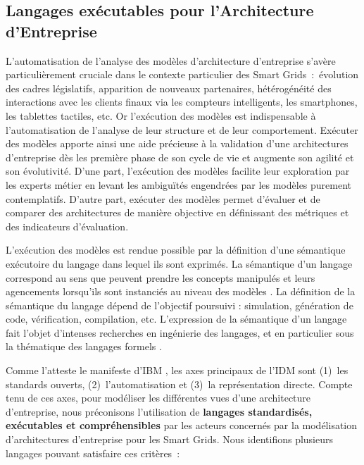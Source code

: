 %
%
%
%
%
%
%



\subsection{Langages exécutables pour l'Architecture d'Entreprise}

L'automatisation de l'analyse des modèles d'architecture d'entreprise s'avère particulièrement cruciale dans le contexte particulier des Smart Grids~:~évolution des cadres législatifs,  apparition de nouveaux partenaires, hétérogénéité des interactions avec les clients finaux via les compteurs intelligents, les smartphones, les tablettes tactiles, etc. Or l'exécution des modèles est indispensable à l'automatisation de l'analyse de leur structure et de leur comportement. Exécuter des modèles apporte ainsi une aide précieuse à la validation d'une architectures d'entreprise dès les première phase de son cycle de vie et augmente son agilité et son évolutivité. D'une part, l'exécution des modèles facilite leur exploration  par les experts métier en levant les ambiguïtés engendrées par les modèles purement contemplatifs. D'autre part, exécuter des modèles permet d'évaluer et de comparer des architectures de manière objective en définissant des métriques et des indicateurs d'évaluation. 

L'exécution des modèles est rendue possible par la définition d'une sémantique exécutoire du langage dans lequel ils sont exprimés. La sémantique d'un langage correspond au sens que peuvent prendre les concepts manipulés et leurs agencements lorsqu'ils sont instanciés au niveau des modèles \cite{jezequel2012ingenierie}. La définition de la sémantique du langage dépend de l'objectif poursuivi : simulation, génération de code, vérification, compilation, etc. L'expression de la sémantique d'un langage fait l'objet d'intenses recherches en ingénierie des langages, et en particulier sous la thématique des langages formels \cite{kleppe2007language}. 

Comme l'atteste le manifeste d'IBM \cite{chesbrough2006research}, les axes principaux de l'IDM sont (1)~les standards ouverts, (2)~l'automatisation et (3)~la représentation directe. Compte tenu de ces axes, pour modéliser les différentes vues d'une architecture d'entreprise, nous préconisons l'utilisation de \textbf{langages standardisés, exécutables et compréhensibles} par les acteurs concernés par la modélisation d'architectures d'entreprise pour les Smart Grids. 
Nous identifions plusieurs langages pouvant satisfaire ces critères~:


